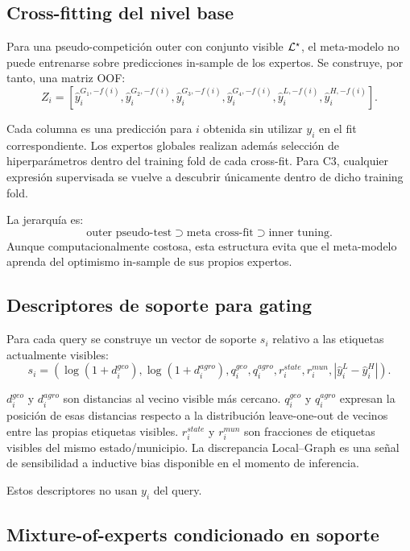 \subsection{Cross-fitting del nivel base}

Para una pseudo-competición outer con conjunto visible $\mathcal{L}^\star$, el meta-modelo no puede
entrenarse sobre predicciones in-sample de los expertos. Se construye, por tanto, una matriz
OOF:
\[
Z_i=
\left[
\hat y_i^{G_1,-f(i)},
\hat y_i^{G_2,-f(i)},
\hat y_i^{G_3,-f(i)},
\hat y_i^{G_4,-f(i)},
\hat y_i^{L,-f(i)},
\hat y_i^{H,-f(i)}
\right].
\]

Cada columna es una predicción para $i$ obtenida sin utilizar $y_i$ en el fit correspondiente.
Los expertos globales realizan además selección de hiperparámetros dentro del training fold de
cada cross-fit. Para C3, cualquier expresión supervisada se vuelve a descubrir únicamente
dentro de dicho training fold.

La jerarquía es:
\[
\text{outer pseudo-test}
\supset
\text{meta cross-fit}
\supset
\text{inner tuning}.
\]
Aunque computacionalmente costosa, esta estructura evita que el meta-modelo aprenda del
optimismo in-sample de sus propios expertos.

\subsection{Descriptores de soporte para gating}

Para cada query se construye un vector de soporte $s_i$ relativo a las etiquetas actualmente
visibles:
\[
s_i=
(
\log(1+d_i^{geo}),
\log(1+d_i^{agro}),
q_i^{geo},
q_i^{agro},
r_i^{state},
r_i^{mun},
|\hat y_i^L-\hat y_i^H|
).
\]

$d_i^{geo}$ y $d_i^{agro}$ son distancias al vecino visible más cercano.
$q_i^{geo}$ y $q_i^{agro}$ expresan la posición de esas distancias respecto a la distribución
leave-one-out de vecinos entre las propias etiquetas visibles. $r_i^{state}$ y $r_i^{mun}$
son fracciones de etiquetas visibles del mismo estado/municipio. La discrepancia Local--Graph
es una señal de sensibilidad a inductive bias disponible en el momento de inferencia.

Estos descriptores no usan $y_i$ del query.

\subsection{Mixture-of-experts condicionado en soporte}

